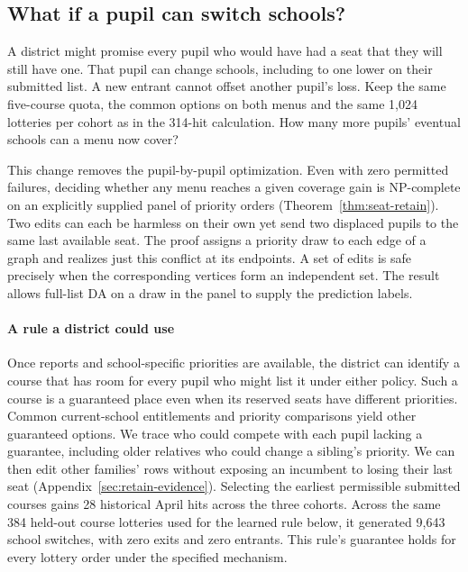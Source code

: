 \subsection{What if a pupil can switch schools?}\label{sec:retain}
A district might promise every pupil who would have had a seat that they will still have one. That pupil can change schools, including to one lower on their submitted list. A new entrant cannot offset another pupil's loss. Keep the same five-course quota, the common options on both menus and the same 1,024 lotteries per cohort as in the 314-hit calculation. How many more pupils' eventual schools can a menu now cover?

This change removes the pupil-by-pupil optimization. Even with zero permitted failures, deciding whether any menu reaches a given coverage gain is NP-complete on an explicitly supplied panel of priority orders (Theorem~\ref{thm:seat-retain}). Two edits can each be harmless on their own yet send two displaced pupils to the same last available seat. The proof assigns a priority draw to each edge of a graph and realizes just this conflict at its endpoints. A set of edits is safe precisely when the corresponding vertices form an independent set. The result allows full-list DA on a draw in the panel to supply the prediction labels.



\paragraph{A rule a district could use}
Once reports and school-specific priorities are available, the district can identify a course that has room for every pupil who might list it under either policy. Such a course is a guaranteed place even when its reserved seats have different priorities. Common current-school entitlements and priority comparisons yield other guaranteed options. We trace who could compete with each pupil lacking a guarantee, including older relatives who could change a sibling's priority. We can then edit other families' rows without exposing an incumbent to losing their last seat (Appendix~\ref{sec:retain-evidence}). Selecting the earliest permissible submitted courses gains 28 historical April hits across the three cohorts. Across the same 384 held-out course lotteries used for the learned rule below, it generated 9,643 school switches, with zero exits and zero entrants. This rule's guarantee holds for every lottery order under the specified mechanism.

